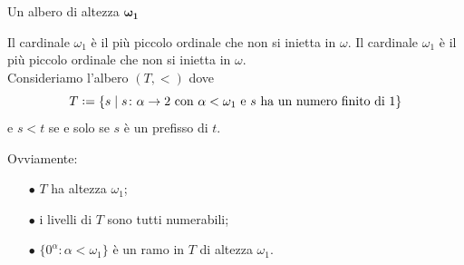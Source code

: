 \documentclass{beamer}
\theoremstyle{num.custom-title}
\theoremstyle{custom-title}
\newcommand*{\defeq}{\mathrel{\rlap{%
                     \raisebox{0.3ex}{$\cdot$}}%
                     \raisebox{-0.3ex}{$\cdot$}}%
                     =}
\begin{document}
\begin{frame}{Un albero di altezza $\pmb{\omega_1}$}

\begin{overprint}
 Il cardinale $\omega_1$ è il più piccolo ordinale che non si inietta in $\omega$.
 Il cardinale $\omega_1$ è il più piccolo ordinale che non si inietta in $\omega$.\\
Consideriamo l'albero $(T,<)$ dove
\[
T \defeq \{s \mid s \colon \alpha \to 2 \text{ con $\alpha < \omega_1$ e $s$ ha un numero finito di 1}\}
\]
e $s<t$ se e solo se $s$ è un prefisso di $t$.


\vspace{-2pt}
Ovviamente:
\vspace{-4pt}
\begin{itemize}
\item[\textcolor{mLightBrown}{$\bullet$}] $T$ ha altezza $\omega_1$;
\item[\textcolor{mLightBrown}{$\bullet$}] i livelli di $T$ sono tutti numerabili; 
\item[\textcolor{mLightBrown}{$\bullet$}] $\{0^\alpha : \alpha < \omega_1\}$ è un ramo in $T$ di altezza $\omega_1$.%
\end{itemize}
\end{overprint}

\vspace{-18pt}

\end{frame}
\end{document}
